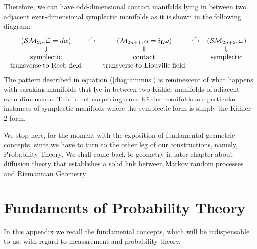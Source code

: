 \documentclass[10pt,a4paper]{article}
\def\tilde{\widetilde}
\begin{document}
Therefore, we can have odd-dimensional contact manifolds lying in between two adjacent even-dimensional symplectic manifolds as it is shown in the following diagram:
\begin{equation}\label{diagrammus}
\begin{array}{ccccc}
    \left(\mathcal{SM}_{2n},\tilde{\omega}=d\alpha\right)
    &\stackrel{\iota}{\hookrightarrow}
    &\left(\mathcal{M}_{2n+1},\alpha=i_\mathbf{L}\omega\right)
    &\stackrel{\iota}{\hookrightarrow}
    & \left(\mathcal{SM}_{2n+2},\omega\right)\\
    \Downarrow &\null& \Downarrow &\null & \Downarrow\\
    \text{symplectic}&\null& \text{contact}& \null &
    \text{symplectic}\\
\text{transverse to Reeb field}&\null& \text{transverse to Liouville
field}& \null &
    \null\\
    \end{array}
\end{equation}
The pattern described in equation (\ref{diagrammus}) is reminescent
of what happens with sasakian manifolds
that lye in between two K\"ahler manifolds  of adiacent even dimensions.
This is not surprising  since
K\"ahler manifolds are particular instances of  symplectic manifolds where the
symplectic form is simply the   K\"ahler $2$-form.
\par
We stop here, for the moment with the exposition of fundamental geometric concepts, since we have to turn to the other
leg of our constructions, namely, Probability Theory. We shall come  back to geometry in later chapter about diffusion theory
that establishes a solid link between Markov random processes and Riemannian Geometry.
\section{Fundaments of  Probability Theory}
\label{fondiprobi}
In this appendix we recall the fundamental concepts, which will be indispensable to us, with regard to measurement and probability theory.
\end{document}
